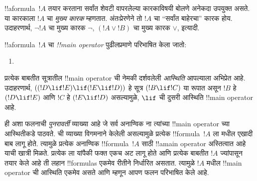 \documentclass[../../../include/open-logic-section]{subfiles}
\begin{document}


\begin{explain}
!!a{formula}~$!A$ तयार करताना सर्वांत शेवटी वापरलेल्या कारकाविषयी
बोलणे अनेकदा उपयुक्त असते. या कारकाला $!A$ चा \emph{मुख्य कारक}
म्हणतात. अंतःप्रेरणेने तो $!A$ चा ``सर्वांत बाहेरचा'' कारक होय.
उदाहरणार्थ, $\lnot !A$ चा मुख्य कारक $\lnot$, $(!A \lor !B)$ चा
मुख्य कारक $\lor$, इत्यादी.
\end{explain}


\begin{defn}
!!a{formula}~$!A$ चा \emph{!!{main operator}} पुढीलप्रमाणे परिभाषित केला जातो:
\begin{enumerate}
\item {}







\end{enumerate}
\end{defn}

प्रत्येक बाबतीत सूत्रातील !!{main operator} ची नेमकी दर्शवलेली
\emph{आस्थिति} आपल्याला अभिप्रेत आहे. उदाहरणार्थ,
$((!D \lif !E) \lif (!E \lif !D))$ हे सूत्र $(!B \lif !C)$ या रूपात
असून $!B$ हे $(!D \lif !E)$ आणि $!C$ हे $(!E \lif !D)$ असल्यामुळे,
$\lif$ ची दुसरी आस्थिति !!{main operator} आहे.

\begin{explain}
ही अशा फलनाची \emph{पुनरावर्ती} व्याख्या आहे जे सर्व अनाण्विक
ना त्यांच्या !!{main operator} च्या आस्थितीकडे पाठवते.
ची व्याख्या विगमनाने केलेली असल्यामुळे प्रत्येक
!!{formula}~$!A$ ला  मधील एखादी बाब लागू होते.
त्यामुळे प्रत्येक अनाण्विक !!{formula}~$!A$ साठी !!a{main
  operator}
अस्तित्वात आहे याची खात्री मिळते. प्रत्येक ला यांपैकी
फक्त एकच अट लागू होते आणि प्रत्येक बाबतीत $!A$ ज्यांपासून तयार केले
आहे ती लहान !!{formula}s एकमेव रीतीने निर्धारित असतात. त्यामुळे $!A$
मधील !!{main
  operator} ची आस्थिति एकमेव असते आणि म्हणून आपण फलन
परिभाषित केले आहे.
\end{explain}
\end{document}

